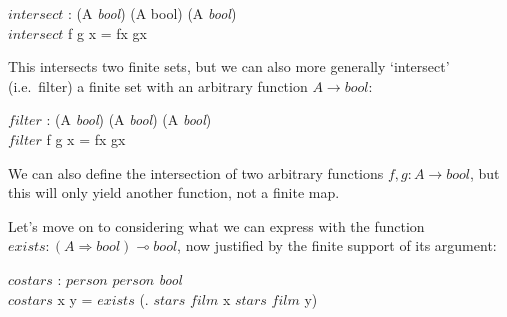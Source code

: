 \documentclass[runningheads]{llncs}
\makeatletter
\newlength{\negph@wd}
\DeclareRobustCommand{\negphantom}[1]{%
  \ifmmode
    \mathpalette\negph@math{#1}%
  \else
    \negph@do{#1}%
  \fi
}
\newcommand{\negph@math}[2]{\negph@do{$\m@th#1#2$}}
\newcommand{\negph@do}[1]{%
  \settowidth{\negph@wd}{#1}%
  \hspace*{-\negph@wd}%
}\makeatother
\newcommand\strong[1]{{\bfseries#1}}
\newcommand\todo[1]{{\color{IndianRed}#1}}
\newcommand\xxx{\text{\todo{\strong{XXX}}}}
\renewcommand\todo[1]{\ignorespaces}\renewcommand\xxx{\text{\color{IndianRed}\strong{XXX}}}
\newcommand\name[1]{\ensuremath{\mathit{#1}}}
\newcommand\<\:                 %
\newcommand\fnspace{\<}         %
\newcommand\fn[1]{\lambda{#1}.\fnspace}
\newcommand\lto\multimap        %
\newcommand\fto\Rightarrow
\newcommand\typename\textit
\newcommand\bool{\typename{bool}}
\newcommand\kword[1]{\ensuremath{\textrm{#1}}}
\newcommand\tand{\mathrel{\kword{and}}}
\makeatother
\begin{document}
\begin{code}
  \name{intersect} : (A \fto \bool) \lto (A \fto bool) \lto (A \fto \bool)\\
  \name{intersect} \<f \<g \<x = f\<x \tand g\<x
\end{code}

\noindent
This intersects two finite sets, but we can also more generally `intersect' (i.e.\ filter) a finite set with an arbitrary function $A \to \bool$: \todo{THIS TYPE NO MAKE SENSE, IT REQUIRES $(A \to \bool)$ to be a pointed type, which is semantically fine but we haven't done it yet}

\begin{code}
  \name{filter} : (A \fto \bool) \lto (A \to \bool) \lto (A \fto \bool)\\
  \name{filter} \<f \<g \<x = f\<x \tand g\<x
\end{code}

\noindent
We can also define the intersection of two arbitrary functions $f,g : A \to \bool$, but this will only yield another function, not a finite map.

Let's move on to considering what we can express with the function $\name{exists} : (A \fto \bool) \lto \bool$, now justified by the finite support of its argument:



\begin{code}
  \name{costars} : \name{person} \fto \name{person} \fto \bool\\
  \name{costars} \<x \<y =
  \name{exists} \<(\fn{\name{film}} \name{stars} \<\name{film} \<x
  \tand \name{stars} \<\name{film} \<y)
\end{code}
\end{document}
